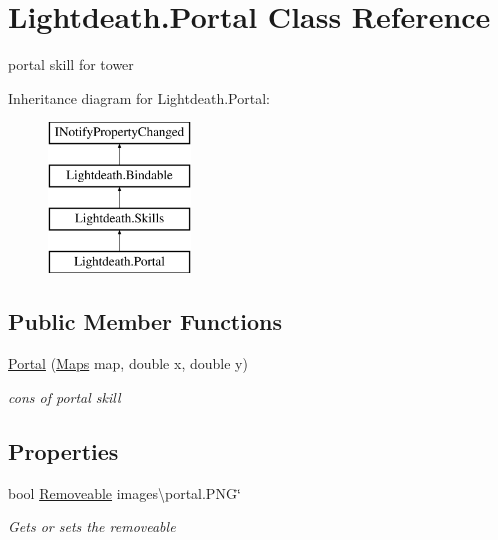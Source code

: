 \hypertarget{class_lightdeath_1_1_portal}{}\section{Lightdeath.\+Portal Class Reference}
\label{class_lightdeath_1_1_portal}


portal skill for tower  


Inheritance diagram for Lightdeath.\+Portal\+:\begin{figure}[H]
\begin{center}
\leavevmode
\includegraphics[height=4.000000cm]{class_lightdeath_1_1_portal}
\end{center}
\end{figure}
\subsection*{Public Member Functions}
\begin{DoxyCompactItemize}
\item 
\hyperlink{class_lightdeath_1_1_portal_a1f18b80a0853b945987d6f51b07f0abb}{Portal} (\hyperlink{class_lightdeath_1_1_maps}{Maps} map, double x, double y)
\begin{DoxyCompactList}\small\item\em cons of portal skill \end{DoxyCompactList}\end{DoxyCompactItemize}
\subsection*{Properties}
\begin{DoxyCompactItemize}
\item 
bool \hyperlink{class_lightdeath_1_1_portal_a9e6e1b61d55fc1b5311ed0449a135813}{Removeable} images\textbackslash{}portal.\+P\+NG\char`\"{}
\begin{DoxyCompactList}\small\item\em Gets or sets the removeable \end{DoxyCompactList}\end{DoxyCompactItemize}
